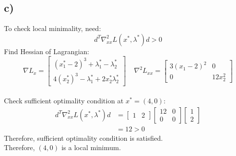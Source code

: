 \documentclass{article}
\begin{document}
\subsection*{c)}\label{ssec:name}
To check local minimality, need:
$$d^T\nabla^2_{xx}L(x^*,\lambda^*)d>0$$
Find Hessian of Lagrangian:
$$
\nabla L_x=
\begin{bmatrix}
(x_1^*-2)^3+\lambda_1^*-\lambda_2^*\\
4(x_2^*)^3-\lambda_1^*+2x_2^*\lambda_2^*
\end{bmatrix}
\;\;\;\;
\nabla^2L_{xx}=
\begin{bmatrix}
3(x_1-2)^2 & 0\\
0 & 12x_2^2
\end{bmatrix}
$$
\\
Check sufficient optimality condition at $x^*=(4,0)$:
\begin{align*}
d^T\nabla^2_{xx}L(x^*,\lambda^*)d&=
\begin{bmatrix}
1 & 2
\end{bmatrix}
\begin{bmatrix}
12 & 0\\
0 & 0
\end{bmatrix}
\begin{bmatrix}
1\\
2
\end{bmatrix}
\\
&=12>0
\end{align*}
Therefore, sufficient optimality condition is satisfied.\\
Therefore, $(4,0)$ is a local minimum.
\end{document}
